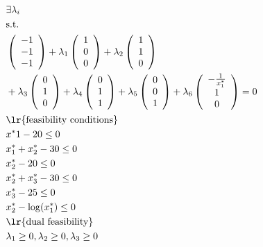 \documentclass[paper=a4, fontsize=11pt]{article}
\numberwithin{equation}{section} %
\numberwithin{figure}{section} %
\numberwithin{table}{section} %
\begin{document}
\begin{equation}
	\begin{aligned}
		& \exists \lambda_i \\
		& \text{s.t.} \\
		& \left( \begin{array}{c} -1 \\ -1 \\ -1 \end{array} \right)
		+ \lambda_1 \left( \begin{array}{c} 1 \\ 0 \\ 0 \end{array} \right)
		+ \lambda_2 \left( \begin{array}{c} 1 \\ 1 \\ 0 \end{array} \right)\\
		& + \lambda_3 \left( \begin{array}{c} 0 \\ 1 \\ 0 \end{array} \right)
		+ \lambda_4 \left( \begin{array}{c} 0 \\ 1 \\ 1 \end{array} \right)
		+ \lambda_5 \left( \begin{array}{c} 0 \\ 0 \\ 1 \end{array} \right)
		+ \lambda_6 \left( \begin{array}{c} -\frac{1}{x^*_1} \\ 1 \\ 0 \end{array} \right)
		= 0 \\
		& \text{\lr{feasibility conditions}} \\
		& x^*1 - 20 \le 0\\
		& x^*_1 + x^*_2 - 30 \le 0 \\
		& x^*_2 - 20 \le 0 \\
		& x^*_2 + x^*_3 - 30 \le 0 \\
		& x^*_3 - 25 \le 0 \\
		& x^*_2 - \log(x^*_1) \le 0 \\ 
		& \text{\lr{dual feasibility}} \\
		& \lambda_1 \ge 0,
		\lambda_2 \ge 0,
		\lambda_3 \ge 0 \\

\end{aligned}
\end{equation}
\end{document}
